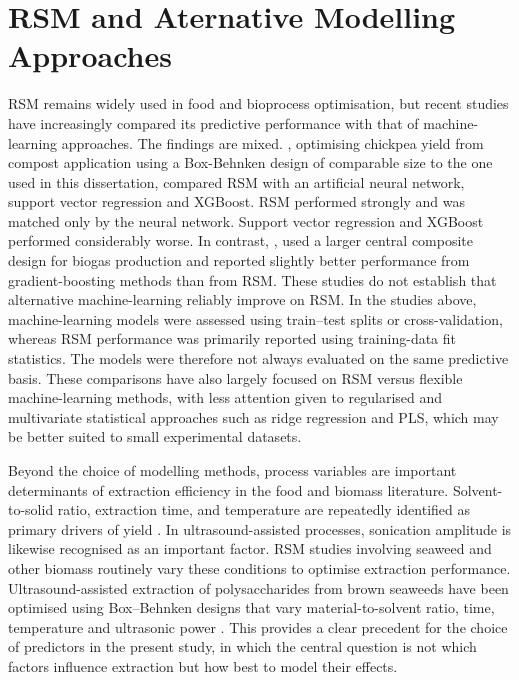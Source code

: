 \documentclass[MScDSA]{uccthesis}
\begin{document}
\section{RSM and Aternative Modelling Approaches}
\label{sec:rsm_and_alt_modelling}
RSM remains widely used in food and bioprocess optimisation, but recent studies have increasingly compared its predictive performance with that of machine-learning approaches. The findings are mixed. \parencite{Mehdaoui:2025}, optimising chickpea yield from compost application using a Box-Behnken design of comparable size to the one used in this dissertation, compared RSM with an artificial neural network, support vector regression and XGBoost. RSM performed strongly and was matched only by the neural network. Support vector regression and XGBoost performed considerably worse. In contrast, \parencite{Ahmad:2024}, used a larger central composite design for biogas production and reported slightly better performance from gradient-boosting methods than from RSM. These studies do not establish that alternative machine-learning reliably improve on RSM. In the studies above, machine-learning models were assessed using train--test splits or cross-validation, whereas RSM performance was primarily reported using training-data fit statistics. The models were therefore not always evaluated on the same predictive basis. These comparisons have also largely focused on RSM versus flexible machine-learning methods, with less attention given to regularised and multivariate statistical approaches such as ridge regression and PLS, which may be better suited to small experimental datasets.

Beyond the choice of modelling methods, process variables are important determinants of extraction efficiency in the food and biomass literature. Solvent-to-solid ratio, extraction time, and temperature are repeatedly identified as primary drivers of yield \parencite{Bhadange:2024}. In ultrasound-assisted processes, sonication amplitude is likewise recognised as an important factor. RSM studies involving seaweed and other biomass routinely vary these conditions to optimise extraction performance. Ultrasound-assisted extraction of polysaccharides from brown seaweeds have been optimised using Box--Behnken designs that vary material-to-solvent ratio, time, temperature and ultrasonic power \parencite{Wan:2015}. This provides a clear precedent for the choice of predictors in the present study, in which the central question is not which factors influence extraction but how best to model their effects.
\end{document}
